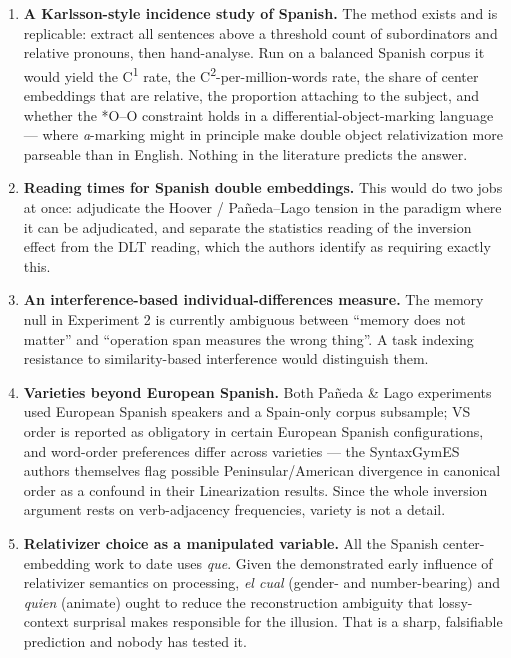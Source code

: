 \documentclass[11pt, a4paper]{article}
\begin{document}
\begin{enumerate}[label=\roman*., leftmargin=2.4em, itemsep=1em]

\item \textbf{A Karlsson-style incidence study of Spanish.} The method exists and is replicable: extract all sentences above a threshold count of subordinators and relative pronouns, then hand-analyse. Run on a balanced Spanish corpus it would yield the C\textsuperscript{1} rate, the C\textsuperscript{2}-per-million-words rate, the share of center embeddings that are relative, the proportion attaching to the subject, and whether the *O--O constraint holds in a differential-object-marking language --- where \emph{a}-marking might in principle make double object relativization more parseable than in English. Nothing in the literature predicts the answer.

\item \textbf{Reading times for Spanish double embeddings.} This would do two jobs at once: adjudicate the Hoover / Pañeda--Lago tension in the paradigm where it can be adjudicated, and separate the statistics reading of the inversion effect from the DLT reading, which the authors identify as requiring exactly this.

\item \textbf{An interference-based individual-differences measure.} The memory null in Experiment 2 is currently ambiguous between ``memory does not matter'' and ``operation span measures the wrong thing''. A task indexing resistance to similarity-based interference would distinguish them.

\item \textbf{Varieties beyond European Spanish.} Both Pañeda \& Lago experiments used European Spanish speakers and a Spain-only corpus subsample; VS order is reported as obligatory in certain European Spanish configurations, and word-order preferences differ across varieties --- the SyntaxGymES authors themselves flag possible Peninsular/American divergence in canonical order as a confound in their Linearization results. Since the whole inversion argument rests on verb-adjacency frequencies, variety is not a detail.

\item \textbf{Relativizer choice as a manipulated variable.} All the Spanish center-embedding work to date uses \emph{que}. Given the demonstrated early influence of relativizer semantics on processing, \emph{el cual} (gender- and number-bearing) and \emph{quien} (animate) ought to reduce the reconstruction ambiguity that lossy-context surprisal makes responsible for the illusion. That is a sharp, falsifiable prediction and nobody has tested it.

\end{enumerate}
\end{document}
